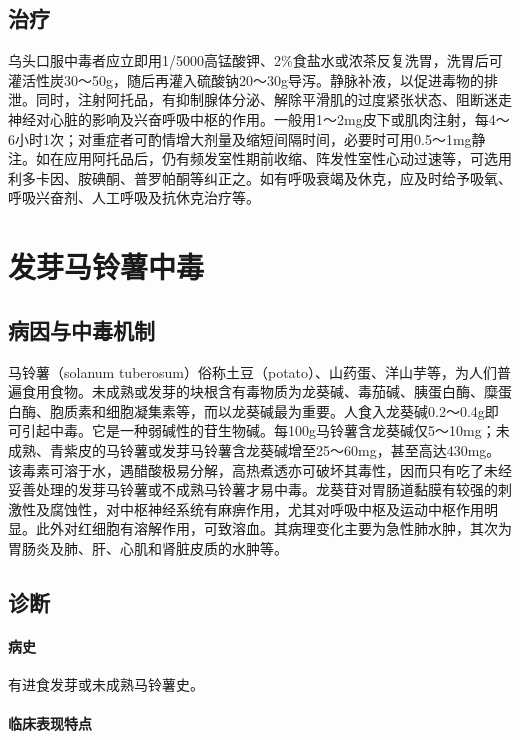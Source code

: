 \subsection{治疗}

乌头口服中毒者应立即用1/5000高锰酸钾、2\%食盐水或浓茶反复洗胃，洗胃后可灌活性炭30～50g，随后再灌入硫酸钠20～30g导泻。静脉补液，以促进毒物的排泄。同时，注射阿托品，有抑制腺体分泌、解除平滑肌的过度紧张状态、阻断迷走神经对心脏的影响及兴奋呼吸中枢的作用。一般用1～2mg皮下或肌肉注射，每4～6小时1次；对重症者可酌情增大剂量及缩短间隔时间，必要时可用0.5～1mg静注。如在应用阿托品后，仍有频发室性期前收缩、阵发性室性心动过速等，可选用利多卡因、胺碘酮、普罗帕酮等纠正之。如有呼吸衰竭及休克，应及时给予吸氧、呼吸兴奋剂、人工呼吸及抗休克治疗等。

\protect\hypertarget{text00165.html}{}{}

\section{发芽马铃薯中毒}

\subsection{病因与中毒机制}

马铃薯（solanum
tuberosum）俗称土豆（potato）、山药蛋、洋山芋等，为人们普遍食用食物。未成熟或发芽的块根含有毒物质为龙葵碱、毒茄碱、胰蛋白酶、糜蛋白酶、胞质素和细胞凝集素等，而以龙葵碱最为重要。人食入龙葵碱0.2～0.4g即可引起中毒。它是一种弱碱性的苷生物碱。每100g马铃薯含龙葵碱仅5～10mg；未成熟、青紫皮的马铃薯或发芽马铃薯含龙葵碱增至25～60mg，甚至高达430mg。该毒素可溶于水，遇醋酸极易分解，高热煮透亦可破坏其毒性，因而只有吃了未经妥善处理的发芽马铃薯或不成熟马铃薯才易中毒。龙葵苷对胃肠道黏膜有较强的刺激性及腐蚀性，对中枢神经系统有麻痹作用，尤其对呼吸中枢及运动中枢作用明显。此外对红细胞有溶解作用，可致溶血。其病理变化主要为急性肺水肿，其次为胃肠炎及肺、肝、心肌和肾脏皮质的水肿等。

\subsection{诊断}

\paragraph{病史}

有进食发芽或未成熟马铃薯史。

\paragraph{临床表现特点}

